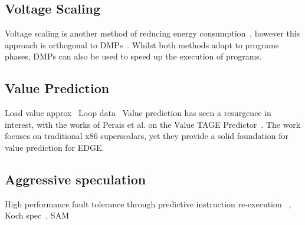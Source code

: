 \subsection{Voltage Scaling}
Voltage scaling is another method of reducing energy consumption~\cite{paganiEECHM2017}, however this approach is orthogonal to DMPs~\cite{sibi2014}.
Whilst both methods adapt to programs phases, DMPs can also be used to speed up the execution of programs.

\subsection{Value Prediction}
Load value approx~\cite{miguel2014LoadVal}
Loop data~\cite{murphy2016loopdata}
Value prediction has seen a resurgence in interest, with the works of Perais et al. on the Value TAGE Predictor~\cite{peraisBeBop2015,peraisVTAGE2014}.
The work focuses on traditional x86 superscalars, yet they provide a solid foundation for value prediction for EDGE.

\subsection{Aggressive speculation}

High performance fault tolerance through predictive instruction re-execution ~\cite{soman2017predinst}, Koch spec~\cite{koch2013spec}, SAM~\cite{Abeydeera2017SpecMulti}